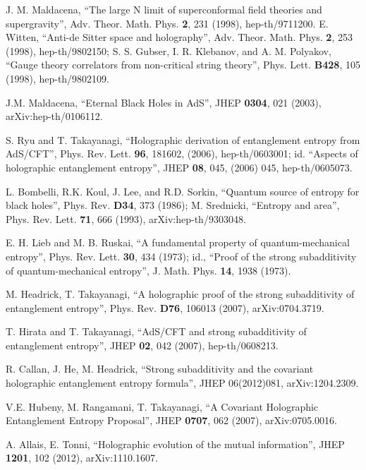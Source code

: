 \documentclass{article}
\begin{document}
\begin{thebibliography}{99}
J. M. Maldacena, ``The large N limit of superconformal field theories and supergravity'', 
Adv. Theor. Math. Phys. \textbf{2}, 231 (1998), hep-th/9711200. 
E. Witten, ``Anti-de Sitter space and holography'', Adv. Theor. Math. Phys. \textbf{2}, 253 (1998), hep-th/9802150;
S. S. Gubser, I. R. Klebanov, and A. M. Polyakov, ``Gauge theory correlators from non-critical 
string theory'', Phys. Lett. \textbf{B428}, 105 (1998), hep-th/9802109.

J.M. Maldacena, ``Eternal Black Holes in AdS'',  JHEP \textbf{0304}, 021 (2003),  arXiv:hep-th/0106112.

S. Ryu and T. Takayanagi, ``Holographic derivation of entanglement entropy from AdS/CFT'', 
Phys. Rev. Lett. \textbf{96}, 181602, (2006), hep-th/0603001; 
id. ``Aspects of holographic entanglement entropy'', JHEP \textbf{08}, 045, (2006) 045, hep-th/0605073.

L. Bombelli, R.K. Koul, J. Lee, and R.D. Sorkin, ``Quantum source of 
entropy for black holes'', Phys. Rev. \textbf{D34}, 373 (1986); M. Srednicki, 
``Entropy and area'', Phys. Rev. Lett. \textbf{71}, 666 (1993), arXiv:hep-th/9303048.

E. H. Lieb and M. B. Ruskai, ``A fundamental property of quantum-mechanical entropy'',
 Phys. Rev. Lett. \textbf{30}, 434 (1973); id., 
``Proof of the strong subadditivity of quantum-mechanical entropy'', 
J. Math. Phys. \textbf{14}, 1938 (1973).

 M. Headrick, T. Takayanagi, ``A holographic proof of the strong subadditivity of entanglement entropy'', Phys. Rev. \textbf{D76}, 106013 (2007), arXiv:0704.3719.

T. Hirata and T. Takayanagi, ``AdS/CFT and strong subadditivity of entanglement entropy'', 
JHEP \textbf{02}, 042 (2007), hep-th/0608213.

R. Callan, J. He, M. Headrick,
``Strong subadditivity and the covariant holographic entanglement entropy formula'', JHEP 06(2012)081, 
arXiv:1204.2309.

V.E. Hubeny, M. Rangamani, T. Takayanagi, ``A Covariant Holographic Entanglement Entropy Proposal'',  
JHEP \textbf{0707}, 062 (2007), arXiv:0705.0016.

A. Allais, E. Tonni, ``Holographic evolution of the mutual information'',  JHEP \textbf{1201}, 102 (2012),  arXiv:1110.1607.


\end{thebibliography}
\end{document}
